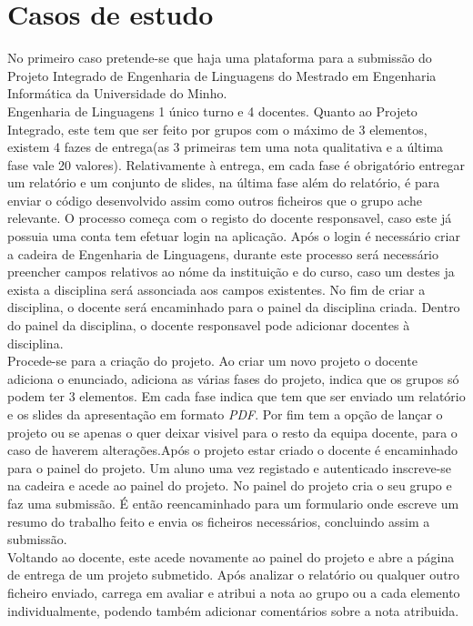 \section{Casos de estudo}


No primeiro caso pretende-se que haja uma plataforma para a submissão do Projeto Integrado de Engenharia de Linguagens do Mestrado em Engenharia Informática da Universidade do Minho.\\
Engenharia de Linguagens 1 único turno e 4 docentes.
Quanto ao Projeto Integrado, este tem que ser feito por grupos com o máximo de 3 elementos, existem 4 fazes de entrega(as 3 primeiras tem uma nota qualitativa e a última fase vale 20 valores). Relativamente à entrega, em cada fase é obrigatório entregar um relatório e um conjunto de slides, na última fase além do relatório, é para enviar o código desenvolvido assim como outros ficheiros que o grupo ache relevante.
O processo começa com o registo do docente responsavel, caso este já possuia uma conta tem efetuar login na aplicação. Após o login é necessário criar a cadeira de Engenharia de Linguagens, durante este processo será necessário preencher campos relativos ao nóme da instituição e do curso, caso um destes ja exista a disciplina será assonciada aos campos existentes. No fim de criar a disciplina, o docente será encaminhado para o painel da disciplina criada. Dentro do painel da disciplina, o docente responsavel pode adicionar docentes à disciplina.\\
Procede-se para a criação do projeto. Ao criar um novo projeto o docente adiciona o enunciado, adiciona as várias fases do projeto, indica que os grupos só podem ter 3 elementos. Em cada fase indica que tem que ser enviado um relatório e os slides da apresentação em formato \emph{PDF}. Por fim tem a opção de lançar o projeto ou se apenas o quer deixar visivel para o resto da equipa docente, para o caso de haverem alterações.Após o projeto estar criado o docente é encaminhado para o painel do projeto.
Um aluno uma vez registado e autenticado inscreve-se na cadeira e acede ao painel do projeto. No painel do projeto cria o seu grupo e faz uma submissão. É então reencaminhado para um formulario onde escreve um resumo do trabalho feito e envia os ficheiros necessários, concluindo assim a submissão.\\
Voltando ao docente, este acede novamente ao painel do projeto e abre a página de entrega de um projeto submetido. Após analizar o relatório ou qualquer outro ficheiro enviado, carrega em avaliar e atribui a nota ao grupo ou a cada elemento individualmente, podendo também adicionar comentários sobre a nota atribuida.\\









